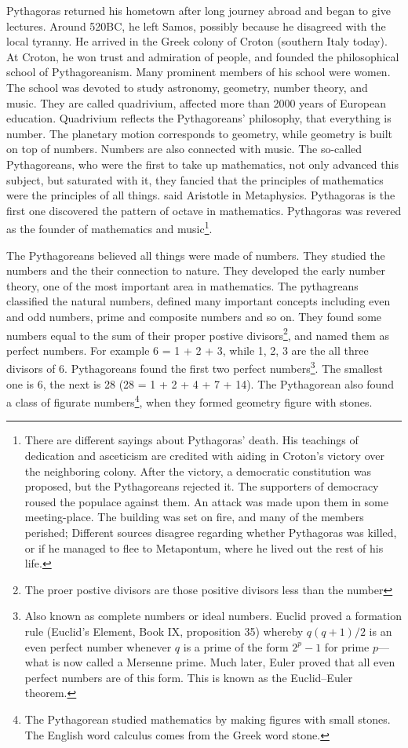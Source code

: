 \documentclass{article}
\begin{document}
Pythagoras returned his hometown after long journey abroad and began to give lectures. Around 520BC, he left Samos, possibly because he disagreed with the local tyranny. He arrived in the Greek colony of Croton (southern Italy today). At Croton, he won trust and admiration of people, and founded the philosophical school of Pythagoreanism. Many prominent members of his school were women. The school was devoted to study astronomy, geometry, number theory, and music. They are called quadrivium, affected more than 2000 years of European education\cite{StepanovRose15}. Quadrivium reflects the Pythagoreans' philosophy, that everything is number. The planetary motion corresponds to geometry, while geometry is built on top of numbers. Numbers are also connected with music. The so-called Pythagoreans, who were the first to take up mathematics, not only advanced this subject, but saturated with it, they fancied that the principles of mathematics were the principles of all things. said Aristotle in Metaphysics. Pythagoras is the first one discovered the pattern of octave in mathematics. Pythagoras was revered as the founder of mathematics and music\footnote{There are different sayings about Pythagoras' death. His teachings of dedication and asceticism are credited with aiding in Croton's victory over the neighboring colony. After the victory, a democratic constitution was proposed, but the Pythagoreans rejected it. The supporters of democracy roused the populace against them. An attack was made upon them in some meeting-place. The building was set on fire, and many of the members perished; Different sources disagree regarding whether Pythagoras was killed, or if he managed to flee to Metapontum, where he lived out the rest of his life.}.

The Pythagoreans believed all things were made of numbers. They studied the numbers and the their connection to nature. They developed the early number theory, one of the most important area in mathematics. The pythagreans classified the natural numbers, defined many important concepts including even and odd numbers, prime and composite numbers and so on. They found some numbers equal to the sum of their proper postive divisors\footnote{The proer postive divisors are those positive divisors less than the number}, and named them as perfect numbers. For example 6 = 1 + 2 + 3, while 1, 2, 3 are the all three divisors of 6. Pythagoreans found the first two perfect numbers\footnote{Also known as complete numbers or ideal numbers. Euclid proved a formation rule (Euclid's Element, Book IX, proposition 35) whereby $q(q+1)/2$ is an even perfect number whenever $q$ is a prime of the form $2^p-1$ for prime $p$—what is now called a Mersenne prime. Much later, Euler proved that all even perfect numbers are of this form. This is known as the Euclid–Euler theorem.}. The smallest one is 6, the next is 28 (28 = 1 + 2 + 4 + 7 + 14). The Pythagorean also found a class of figurate numbers\footnote{The Pythagorean studied mathematics by making figures with small stones. The English word calculus comes from the Greek word stone\cite{HanXueTao16}.}, when they formed geometry figure with stones.
\end{document}
